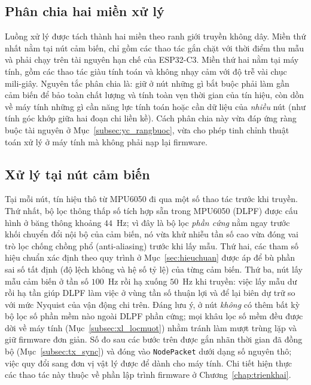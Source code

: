 \documentclass[../DoAn.tex]{subfiles}
\begin{document}
\subsection{Phân chia hai miền xử lý}
\label{subsec:xl_phanchia}
Luồng xử lý được tách thành hai miền theo ranh giới truyền không dây. Miền thứ
nhất nằm tại nút cảm biến, chỉ gồm các thao tác gắn chặt với thời điểm thu mẫu và
phải chạy trên tài nguyên hạn chế của ESP32-C3. Miền thứ hai nằm tại máy tính, gồm
các thao tác giàu tính toán và không nhạy cảm với độ trễ vài chục mili-giây.
Nguyên tắc phân chia là: giữ ở nút những gì bắt buộc phải làm gần cảm biến để bảo
toàn chất lượng và tính toàn vẹn thời gian của tín hiệu, còn dồn về máy tính những
gì cần năng lực tính toán hoặc cần dữ liệu của \textit{nhiều} nút (như tính góc
khớp giữa hai đoạn chi liền kề). Cách phân chia này vừa đáp ứng ràng buộc tài
nguyên ở Mục~\ref{subsec:yc_rangbuoc}, vừa cho phép tinh chỉnh thuật toán xử lý ở
máy tính mà không phải nạp lại firmware.

\subsection{Xử lý tại nút cảm biến}
\label{subsec:xl_node}
Tại mỗi nút, tín hiệu thô từ MPU6050 đi qua một số thao tác trước khi truyền. Thứ
nhất, bộ lọc thông thấp số tích hợp sẵn trong MPU6050 (DLPF) được cấu hình ở băng
thông khoảng $44$~Hz; vì đây là bộ lọc \textit{phần cứng} nằm ngay trước khối
chuyển đổi nội bộ của cảm biến, nó vừa khử nhiễu tần số cao vừa đóng vai trò lọc
chống chồng phổ (anti-aliasing) trước khi lấy mẫu. Thứ hai, các tham số hiệu chuẩn
xác định theo quy trình ở Mục~\ref{sec:hieuchuan} được áp để bù phần sai số tất
định (độ lệch không và hệ số tỷ lệ) của từng cảm biến. Thứ ba, nút lấy mẫu cảm
biến ở tần số $100$~Hz rồi hạ xuống $50$~Hz khi truyền: việc lấy mẫu dư rồi hạ tần
giúp DLPF làm việc ở vùng tần số thuận lợi và để lại biên dự trữ so với mức Nyquist
của vận động chi trên. Đáng lưu ý, ở nút \textit{không} có thêm bất kỳ bộ lọc số
phần mềm nào ngoài DLPF phần cứng; mọi khâu lọc số mềm đều được dời về máy tính
(Mục~\ref{subsec:xl_locmuot}) nhằm tránh làm mượt trùng lặp và giữ firmware đơn
giản. Số đo sau các bước trên được gắn nhãn thời gian đã đồng bộ
(Mục~\ref{subsec:tx_sync}) và đóng vào \texttt{NodePacket} dưới dạng số nguyên
thô; việc quy đổi sang đơn vị vật lý được để dành cho máy tính. Chi tiết hiện thực
các thao tác này thuộc về phần lập trình firmware ở Chương~\ref{chap:trienkhai}.
\end{document}
